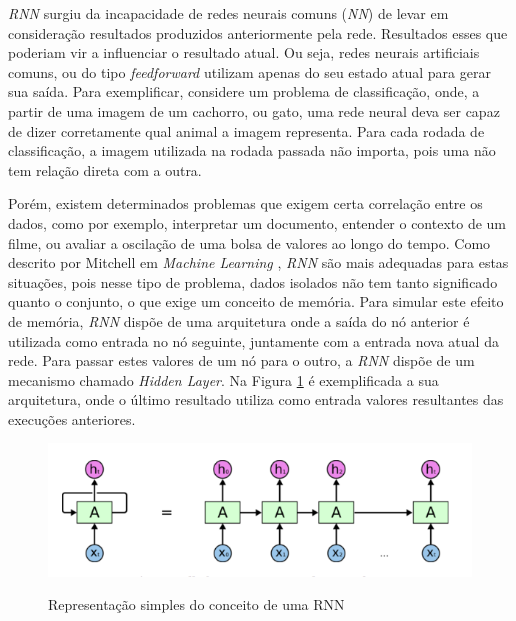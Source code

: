 

\textit{\acrshort{RNN}} surgiu da incapacidade de redes neurais comuns (\textit{\acrshort{NN}}) de levar em consideração resultados produzidos anteriormente pela rede. Resultados esses que poderiam vir a influenciar o resultado atual. Ou seja, redes neurais artificiais comuns, ou do tipo \textit{feedforward} utilizam apenas do seu estado atual para gerar sua saída. Para exemplificar, considere um problema de classificação, onde, a partir de uma imagem de um cachorro, ou gato, uma rede neural deva ser capaz de dizer corretamente qual animal a imagem representa. Para cada rodada de classificação, a imagem utilizada na rodada passada não importa, pois uma não tem relação direta com a outra. 

Porém, existem determinados problemas que exigem certa correlação entre os dados, como por exemplo, interpretar um documento, entender o contexto de um filme, ou avaliar a oscilação de uma bolsa de valores ao longo do tempo. Como descrito por Mitchell em \textit{Machine Learning} \cite{Mitchell_1997}, \textit{\acrshort{RNN}} são mais adequadas para estas situações, pois nesse tipo de problema, dados isolados não tem tanto significado quanto o conjunto, o que exige um conceito de memória. Para simular este efeito de memória, \textit{\acrshort{RNN}} dispõe de uma arquitetura onde a saída do nó anterior é utilizada como entrada no nó seguinte, juntamente com a entrada nova atual da rede. Para passar estes valores de um nó para o outro, a \textit{\acrshort{RNN}} dispõe de um mecanismo chamado \textit{Hidden Layer}. Na Figura \ref{figure:rnn} é exemplificada a sua arquitetura, onde o último resultado utiliza como entrada valores resultantes das execuções anteriores.

\begin{figure}[htbp]
    \centering
    \includegraphics[scale=0.4]{monography/img/models/rnnExample.png}
    \label{figure:rnn}
    \caption[Representação simples do conceito de um RNN]{Representação simples do conceito de uma RNN \footnotemark}
\end{figure}

